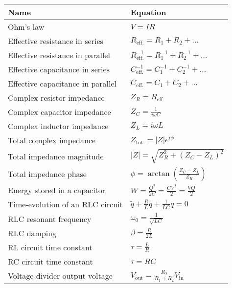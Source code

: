 \documentclass[11pt]{paper}
\begin{document}
\centering
\label{my-label}
\bgroup
\def\arraystretch{2}
\begin{longtable}{ll}
\textbf{Name}       & \textbf{Equation}          \\ \hline
\multicolumn{1}{|l|}{Ohm's law} & \multicolumn{1}{l|}{$V=IR$} \\ \hline
\multicolumn{1}{|l|}{Effective resistance in series} & \multicolumn{1}{l|}{$R_\text{eff.} = R_1 + R_2 + \dots$} \\ \hline
\multicolumn{1}{|l|}{Effective resistance in parallel} & \multicolumn{1}{l|}{$R_\text{eff.}^{-1} = R_1^{-1} + R_2^{-1} + \dots$} \\ \hline

\multicolumn{1}{|l|}{Effective capacitance in series} & \multicolumn{1}{l|}{$C_\text{eff.}^{-1} = C_1^{-1} + C_2^{-1} + \dots$} \\ \hline

\multicolumn{1}{|l|}{Effective capacitance in parallel} & \multicolumn{1}{l|}{$C_\text{eff.} = C_1 + C_2 + \dots$} \\ \hline
\multicolumn{1}{|l|}{Complex resistor impedance} & \multicolumn{1}{l|}{$Z_R = R_\text{eff.}$} \\ \hline
\multicolumn{1}{|l|}{Complex capacitor impedance} & \multicolumn{1}{l|}{$Z_C = \frac{1}{i\omega C}$} \\ \hline
\multicolumn{1}{|l|}{Complex inductor impedance} & \multicolumn{1}{l|}{$Z_L = i\omega L$} \\ \hline
\multicolumn{1}{|l|}{Total complex impedance} & \multicolumn{1}{l|}{$Z_\text{tot.} = |Z|e^{i\phi}$} \\ \hline
\multicolumn{1}{|l|}{Total impedance magnitude} & \multicolumn{1}{l|}{$|Z| = \sqrt{Z_R^2 + \left(Z_C - Z_L\right)^2}$} \\ \hline
\multicolumn{1}{|l|}{Total impedance phase} & \multicolumn{1}{l|}{$\phi = \arctan\left(\frac{Z_C - Z_L}{Z_R}\right)$} \\ \hline
\multicolumn{1}{|l|}{Energy stored in a capacitor} & \multicolumn{1}{l|}{$W = \frac{Q^2}{2C} = \frac{CV^2}{2} = \frac{VQ}{2}$} \\ \hline
\multicolumn{1}{|l|}{Time-evolution of an RLC circuit} & \multicolumn{1}{l|}{$\ddot{q} + \frac{R}{L}\dot{q} + \frac{1}{LC}q = 0$} \\ \hline
\multicolumn{1}{|l|}{RLC resonant frequency} & \multicolumn{1}{l|}{$\omega_0 = \frac{1}{\sqrt{LC}}$} \\ \hline
\multicolumn{1}{|l|}{RLC damping} & \multicolumn{1}{l|}{$\beta = \frac{R}{2L}$} \\ \hline
\multicolumn{1}{|l|}{RL circuit time constant} & \multicolumn{1}{l|}{$\tau = \frac{L}{R}$} \\ \hline
\multicolumn{1}{|l|}{RC circuit time constant} & \multicolumn{1}{l|}{$\tau = RC$} \\ \hline
\multicolumn{1}{|l|}{Voltage divider output voltage} & \multicolumn{1}{l|}{$V_\text{out} = \frac{R_2}{R_1+R_2}V_\text{in}$} \\ \hline
\end{longtable}
\egroup
\end{document}

